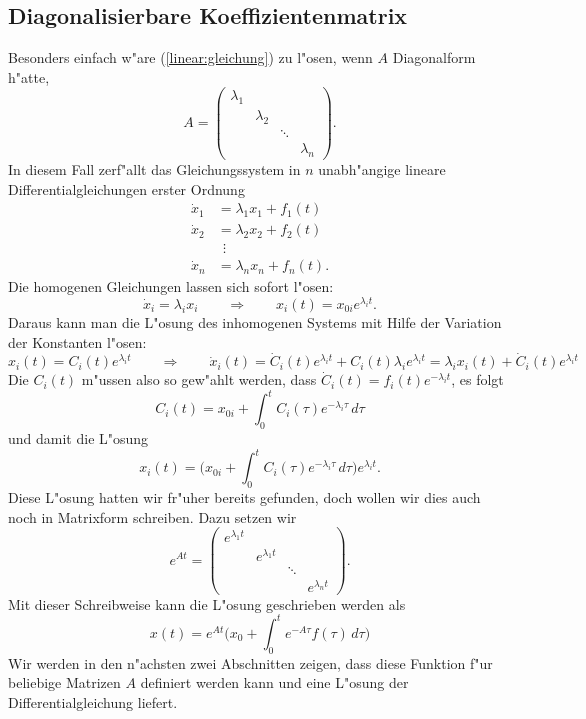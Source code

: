 \subsection{Diagonalisierbare Koeffizientenmatrix}
Besonders einfach w"are (\ref{linear:gleichung}) zu l"osen, wenn $A$
Diagonalform h"atte,
\[
A=\begin{pmatrix}
\lambda_1&         &      &         \\
         &\lambda_2&      &         \\
         &         &\ddots&         \\
         &         &      &\lambda_n
\end{pmatrix}.
\]
%
In diesem Fall zerf"allt das Gleichungssystem in $n$ unabh"angige
lineare Differentialgleichungen erster Ordnung
\begin{align*}
\dot{x}_1&=\lambda_1x_1 + f_1(t)\\
\dot{x}_2&=\lambda_2x_2 + f_2(t)\\
&\;\,\vdots\\
\dot{x}_n&=\lambda_nx_n + f_n(t).
\end{align*}
Die homogenen Gleichungen lassen sich sofort l"osen:
\[
\dot{x}_i=\lambda_ix_i
\qquad
\Rightarrow
\qquad
x_i(t)=x_{0i}e^{\lambda_it}.
\]
Daraus kann man die L"osung des inhomogenen Systems mit Hilfe der
Variation der Konstanten l"osen:
\[
x_i(t)=C_i(t)e^{\lambda_i t}
\qquad
\Rightarrow
\qquad
\dot{x}_i(t)
=
\dot{C}_i(t)e^{\lambda_i t}+C_i(t)\lambda_ie^{\lambda_i t}
=
\lambda_i x_i(t) + \dot{C}_i(t)e^{\lambda_i t}
\]
Die $C_i(t)$ m"ussen also so gew"ahlt werden, dass
$\dot{C}_i(t)=f_i(t)e^{-\lambda_i t}$, es folgt
\[
C_i(t)=x_{0i}+\int_0^t C_i(\tau)e^{-\lambda_i \tau}\,d\tau
\]
und damit die L"osung
\[
x_i(t)
=
\biggl(x_{0i}+\int_0^t C_i(\tau)e^{-\lambda_i \tau}\,d\tau\biggr)
e^{\lambda_i t}.
\]
Diese L"osung hatten wir fr"uher bereits gefunden, doch wollen wir
dies auch noch in Matrixform schreiben.
Dazu setzen wir
\[
e^{At}=\begin{pmatrix}
e^{\lambda_1 t}&               &      &               \\
               &e^{\lambda_1 t}&      &               \\
               &               &\ddots&               \\
               &               &      &e^{\lambda_n t}
\end{pmatrix}.
\]
Mit dieser Schreibweise kann die L"osung geschrieben werden als
\[
x(t)
=
e^{At}
\biggl(x_0 + \int_0^t e^{-A\tau}f(\tau)\,d\tau\biggr)
\]
Wir werden in den n"achsten zwei Abschnitten zeigen, dass diese 
Funktion f"ur beliebige Matrizen $A$ definiert werden kann und
eine L"osung der Differentialgleichung liefert.

